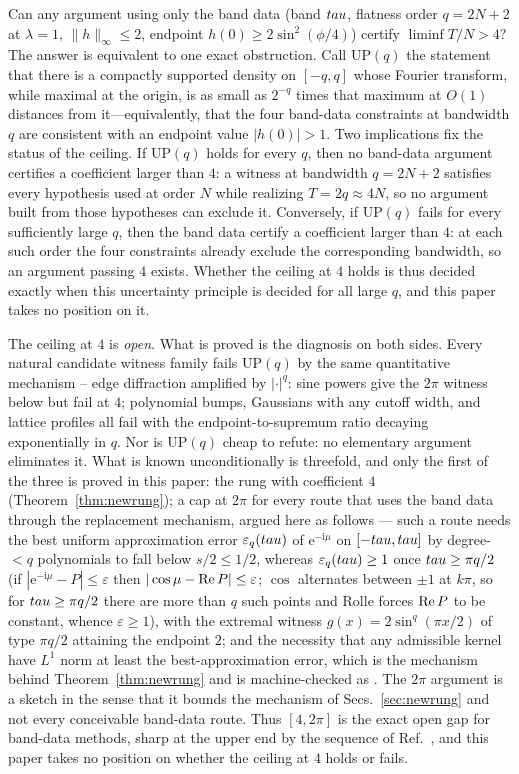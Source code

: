 Can any argument using only the band data (band $tau$, flatness order $q=2N+2$ at
$\lambda=1$, $\|h\|_\infty\le2$, endpoint $h(0)\ge2\sin^2(\phi/4)$) certify
$\liminf T/N>4$? The answer is equivalent to one exact obstruction. Call $\mathrm{UP}(q)$
the statement that there is a compactly supported density on $[-q,q]$ whose Fourier transform,
while maximal at the origin, is as small as $2^{-q}$ times that maximum at $O(1)$ distances
from it---equivalently, that the four band-data constraints at bandwidth $q$ are consistent
with an endpoint value $|h(0)|>1$. Two implications fix the status of the ceiling. If
$\mathrm{UP}(q)$ holds for every $q$, then no band-data argument certifies a coefficient
larger than $4$: a witness at bandwidth $q=2N+2$ satisfies every hypothesis used at order
$N$ while realizing $T=2q\approx4N$, so no argument built from those hypotheses can exclude
it. Conversely, if $\mathrm{UP}(q)$ fails for every sufficiently large $q$, then the band data
certify a coefficient larger than $4$: at each such order the four constraints already exclude
the corresponding bandwidth, so an argument passing $4$ exists. Whether the ceiling at $4$ holds
is thus decided exactly when this uncertainty principle is decided for all large $q$, and this
paper takes no position on it.

The ceiling at $4$ is \emph{open}. What is proved is the diagnosis on both sides. Every
natural candidate witness family fails $\mathrm{UP}(q)$ by the same quantitative
mechanism -- edge diffraction amplified by $|\cdot|^q$: sine powers give the $2\pi$
witness below but fail at $4$; polynomial bumps, Gaussians with any cutoff width, and
lattice profiles all fail with the endpoint-to-supremum ratio decaying exponentially in
$q$. Nor is $\mathrm{UP}(q)$ cheap to refute: no elementary argument eliminates it. What is
known unconditionally is threefold, and only the first of the three is proved in this paper:
the rung with coefficient $4$ (Theorem~\ref{thm:newrung}); a cap at $2\pi$ for every route
that uses the band data through the replacement mechanism, argued here as follows --- such a
route needs the best uniform approximation error $\varepsilon_q(tau)$ of
$\mathrm{e}^{-\mathrm{i}\mu}$ on $[-tau,tau]$ by degree-$<q$ polynomials to fall below
$s/2\le1/2$, whereas $\varepsilon_q(tau)\ge1$ once $tau\ge\pi q/2$ (if
$|\mathrm{e}^{-\mathrm{i}\mu}-P|\le\varepsilon$ then $|\cos\mu-\operatorname{Re} P|\le\varepsilon$;
$\cos$ alternates between $\pm1$ at $k\pi$, so for $tau\ge\pi q/2$ there are more than
$q$ such points and Rolle forces $\operatorname{Re} P$ to be constant, whence
$\varepsilon\ge1$), with the extremal witness $g(x)=2\sin^q(\pi x/2)$ of type $\pi q/2$
attaining the endpoint $2$; and the necessity that any admissible kernel have $L^1$ norm at
least the best-approximation error, which is the mechanism behind Theorem~\ref{thm:newrung}
and is machine-checked as . The $2\pi$ argument is a sketch in the sense
that it bounds the mechanism of Secs.~\ref{sec:newrung} and not every conceivable band-data
route. Thus $[4,2\pi]$ is the exact open gap for band-data
methods, sharp at the upper end by the sequence of Ref.~\cite{Low2014}, and this paper takes no position
on whether the ceiling at $4$ holds or fails.

